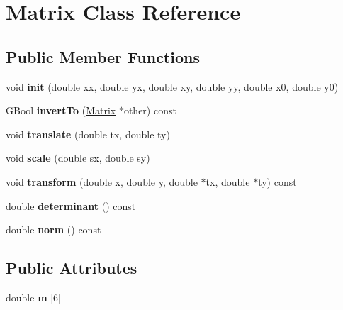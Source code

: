 \hypertarget{class_matrix}{}\section{Matrix Class Reference}
\label{class_matrix}
\subsection*{Public Member Functions}
\begin{DoxyCompactItemize}
\item 
\mbox{\label{class_matrix_a07f82bad304bab7c24872acd5c9130b8}} 
void {\bfseries init} (double xx, double yx, double xy, double yy, double x0, double y0)
\item 
\mbox{\label{class_matrix_a51b6940ea1a7cea62b26eb4b481b6fd5}} 
G\+Bool {\bfseries invert\+To} (\hyperlink{class_matrix}{Matrix} $\ast$other) const
\item 
\mbox{\label{class_matrix_a3d27c6554d2f35540d849fd782aa80a1}} 
void {\bfseries translate} (double tx, double ty)
\item 
\mbox{\label{class_matrix_a475b48e157a374b27d25a393fd4aae86}} 
void {\bfseries scale} (double sx, double sy)
\item 
\mbox{\label{class_matrix_ae38facbc1252c714d19905e1b40b3d04}} 
void {\bfseries transform} (double x, double y, double $\ast$tx, double $\ast$ty) const
\item 
\mbox{\label{class_matrix_a0b959a2e367c53ebde140772ea9281b5}} 
double {\bfseries determinant} () const
\item 
\mbox{\label{class_matrix_a55a5708512effe359ab294bfe61dfcfc}} 
double {\bfseries norm} () const
\end{DoxyCompactItemize}
\subsection*{Public Attributes}
\begin{DoxyCompactItemize}
\item 
\mbox{\label{class_matrix_ab4ca0a18fcf43fcec277046ae12026ef}} 
double {\bfseries m} \mbox{[}6\mbox{]}
\end{DoxyCompactItemize}


